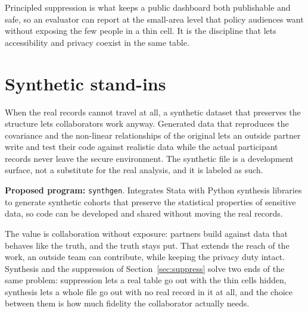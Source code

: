 \documentclass[
    a4paper,
    fontsize=10pt,
    twoside=true,
    numbers=noenddot,
]{kaobook}
\begin{document}
Principled suppression is what keeps a public dashboard both publishable and safe, so an evaluator can report at the small-area level that policy audiences want without exposing the few people in a thin cell. It is the discipline that lets accessibility and privacy coexist in the same table.

\section{Synthetic stand-ins}\label{sec:synth}
When the real records cannot travel at all, a synthetic dataset that preserves the structure lets collaborators work anyway. Generated data that reproduces the covariance and the non-linear relationships of the original lets an outside partner write and test their code against realistic data while the actual participant records never leave the secure environment. The synthetic file is a development surface, not a substitute for the real analysis, and it is labeled as such.

\begin{kaobox}[frametitle=Ado-file Idea: \texttt{synthgen}]
\textbf{Proposed program:} \texttt{synthgen}. Integrates Stata with Python synthesis libraries to generate synthetic cohorts that preserve the statistical properties of sensitive data, so code can be developed and shared without moving the real records.
\end{kaobox}

The value is collaboration without exposure: partners build against data that behaves like the truth, and the truth stays put. That extends the reach of the work, an outside team can contribute, while keeping the privacy duty intact. Synthesis and the suppression of Section~\ref{sec:suppress} solve two ends of the same problem: suppression lets a real table go out with the thin cells hidden, synthesis lets a whole file go out with no real record in it at all, and the choice between them is how much fidelity the collaborator actually needs.
\end{document}
